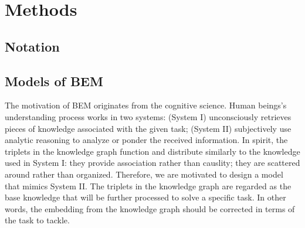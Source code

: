 \section{Methods}

\subsection{Notation}

\subsection{Models of BEM}
The motivation of BEM originates from the cognitive science. Human beings's understanding process works in two systems: (System I) unconsciously retrieves pieces of knowledge associated with the given task; (System II) subjectively use analytic reasoning to analyze or ponder the received information. In spirit, the triplets in the knowledge graph function and distribute similarly to the knowledge used in System I: they provide association rather than causlity; they are scattered around rather than organized. Therefore, we are motivated to design a model that mimics System II. The triplets in the knowledge graph are regarded as the base knowledge that will be further processed to solve a specific task. In other words, the embedding from the knowledge graph should be corrected in terms of the task to tackle.

